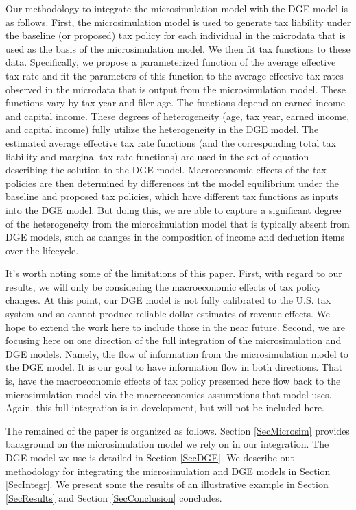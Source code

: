 \documentclass[letterpaper,12pt]{article}
\theoremstyle{definition}
\begin{document}
\begin{spacing}{1.5}
Our methodology to integrate the microsimulation model with the DGE model is as follows.  First, the microsimulation model is used to generate tax liability under the baseline (or proposed) tax policy for each individual in the microdata that is used as the basis of the microsimulation model.  We then fit tax functions to these data.  Specifically, we propose a parameterized function of the average effective tax rate and fit the parameters of this function to the average effective tax rates observed in the microdata that is output from the microsimulation model.  These functions vary by tax year and filer age.  The functions depend on earned income and capital income.  These degrees of heterogeneity (age, tax year, earned income, and capital income) fully utilize the heterogeneity in the DGE model.  The estimated average effective tax rate functions (and the corresponding total tax liability and marginal tax rate functions) are used in the set of equation describing the solution to the DGE model.  Macroeconomic effects of the tax policies are then determined by differences int the model equilibrium under the baseline and proposed tax policies, which have different tax functions as inputs into the DGE model.  But doing this, we are able to capture a significant degree of the heterogeneity from the microsimulation model that is typically absent from DGE models, such as changes in the composition of income and deduction items over the lifecycle.

It's worth noting some of the limitations of this paper.  First, with regard to our results, we will only be considering the macroeconomic effects of tax policy changes.  At this point, our DGE model is not fully calibrated to the U.S. tax system and so cannot produce reliable dollar estimates of revenue effects.  We hope to extend the work here to include those in the near future.  Second, we are focusing here on one direction of the full integration of the microsimulation and DGE models. Namely, the flow of information from the microsimulation model to the DGE model.  It is our goal to have information flow in both directions.  That is, have the macroeconomic effects of tax policy presented here flow back to the microsimulation model via the macroeconomics assumptions that model uses.  Again, this full integration is in development, but will not be included here.  

The remained of the paper is organized as follows.  Section \ref{SecMicrosim} provides background on the microsimulation model we rely on in our integration.  The DGE model we use is detailed in Section \ref{SecDGE}.  We describe out methodology for integrating the microsimulation and DGE models in Section \ref{SecIntegr}.  We present some the results of an illustrative example in Section \ref{SecResults} and Section \ref{SecConclusion} concludes.



\end{spacing}
\end{document}
